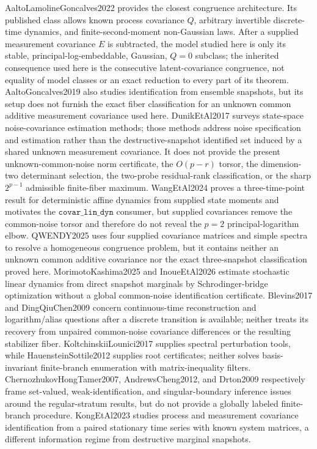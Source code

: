 \documentclass{article}
\begin{document}
AaltoLamolineGoncalves2022 provides the closest congruence architecture.  Its published class allows known process covariance \(Q\), arbitrary invertible discrete-time dynamics, and finite-second-moment non-Gaussian laws.  After a supplied measurement covariance \(E\) is subtracted, the model studied here is only its stable, principal-log-embeddable, Gaussian, \(Q=0\) subclass; the inherited consequence used here is the consecutive latent-covariance congruence, not equality of model classes or an exact reduction to every part of its theorem.  AaltoGoncalves2019 also studies identification from ensemble snapshots, but its setup does not furnish the exact fiber classification for an unknown common additive measurement covariance used here.  DunikEtAl2017 surveys state-space noise-covariance estimation methods; those methods address noise specification and estimation rather than the destructive-snapshot identified set induced by a shared unknown measurement covariance.  It does not provide the present unknown-common-noise norm certificate, the \(O(p-r)\) torsor, the dimension-two determinant selection, the two-probe residual-rank classification, or the sharp \(2^{p-1}\) admissible finite-fiber maximum.  WangEtAl2024 proves a three-time-point result for deterministic affine dynamics from supplied state moments and motivates the \(\texttt{covar\_lin\_dyn}\) consumer, but supplied covariances remove the common-noise torsor and therefore do not reveal the \(p=2\) principal-logarithm elbow.  QWENDY2025 uses four supplied covariance matrices and simple spectra to resolve a homogeneous congruence problem, but it contains neither an unknown common additive covariance nor the exact three-snapshot classification proved here.  MorimotoKashima2025 and InoueEtAl2026 estimate stochastic linear dynamics from direct snapshot marginals by Schrodinger-bridge optimization without a global common-noise identification certificate.  Blevins2017 and DingQiuChen2009 concern continuous-time reconstruction and logarithm/alias questions after a discrete transition is available; neither treats its recovery from unpaired common-noise covariance differences or the resulting stabilizer fiber.  KoltchinskiiLounici2017 supplies spectral perturbation tools, while HauensteinSottile2012 supplies root certificates; neither solves basis-invariant finite-branch enumeration with matrix-inequality filters.  ChernozhukovHongTamer2007, AndrewsCheng2012, and Drton2009 respectively frame set-valued, weak-identification, and singular-boundary inference issues around the regular-stratum results, but do not provide a globally labeled finite-branch procedure.  KongEtAl2023 studies process and measurement covariance identification from a paired stationary time series with known system matrices, a different information regime from destructive marginal snapshots.
\end{document}
